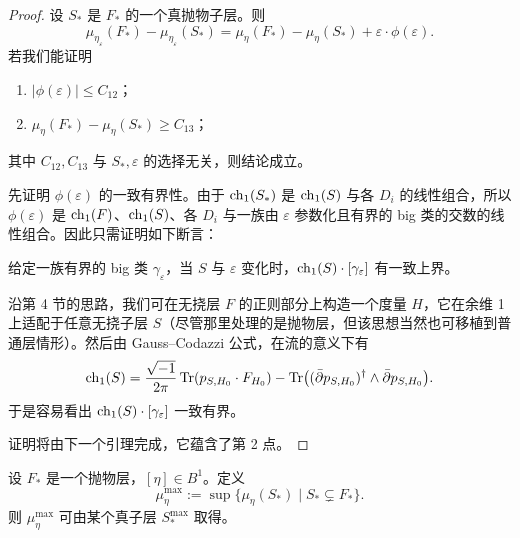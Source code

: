 \begin{proof}
设 \(S_*\) 是 \(F_*\) 的一个真抛物子层。则
\[
\mu_{\eta_\varepsilon}(F_*)-\mu_{\eta_\varepsilon}(S_*)
=
\mu_\eta(F_*)-\mu_\eta(S_*)+\varepsilon\cdot \phi(\varepsilon).
\]
若我们能证明
\begin{enumerate}[label=\arabic*.]
\item \(|\phi(\varepsilon)|\le C_{12}\)；
\item \(\mu_\eta(F_*)-\mu_\eta(S_*)\ge C_{13}\)；
\end{enumerate}
其中 \(C_{12},C_{13}\) 与 \(S_*,\varepsilon\) 的选择无关，则结论成立。

先证明 \(\phi(\varepsilon)\) 的一致有界性。由于 \(\operatorname{ch}_1(S_*)\) 是 \(\operatorname{ch}_1(S)\) 与各 \(D_i\) 的线性组合，所以 \(\phi(\varepsilon)\) 是 \(\operatorname{ch}_1(F)\)、\(\operatorname{ch}_1(S)\)、各 \(D_i\) 与一族由 \(\varepsilon\) 参数化且有界的 big 类的交数的线性组合。因此只需证明如下断言：

\medskip
\noindent
给定一族有界的 big 类 \(\gamma_\varepsilon\)，当 \(S\) 与 \(\varepsilon\) 变化时，\(\operatorname{ch}_1(S)\cdot [\gamma_\varepsilon]\) 有一致上界。
\medskip

沿第 4 节的思路，我们可在无挠层 \(F\) 的正则部分上构造一个度量 \(H\)，它在余维 1 上适配于任意无挠子层 \(S\)（尽管那里处理的是抛物层，但该思想当然也可移植到普通层情形）。然后由 Gauss--Codazzi 公式，在流的意义下有
\[
\operatorname{ch}_1(S)
=
\frac{\sqrt{-1}}{2\pi}\operatorname{Tr}(p_{S,H_0}\cdot F_{H_0})
-
\operatorname{Tr}\bigl((\bar\partial p_{S,H_0})^\dagger\wedge \bar\partial p_{S,H_0}\bigr).
\]
于是容易看出 \(\operatorname{ch}_1(S)\cdot [\gamma_\varepsilon]\) 一致有界。

证明将由下一个引理完成，它蕴含了第 2 点。
\end{proof}

\begin{lemma}
设 \(F_*\) 是一个抛物层，\([\eta]\in B^1\)。定义
\[
\mu_\eta^{\max}:=\sup\{\mu_\eta(S_*)\mid S_*\subsetneq F_*\}.
\]
则 \(\mu_\eta^{\max}\) 可由某个真子层 \(S_*^{\max}\) 取得。
\end{lemma}

